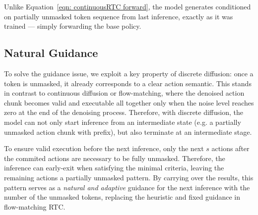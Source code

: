 \documentclass{article}
\begin{document}
Unlike Equation~\ref{eqn: continuousRTC forward}, the model generates conditioned on partially unmasked token sequence from last inference, exactly as it was trained --- simply forwarding the base policy.

\subsection{Natural Guidance}
\label{sec:method_netural}



To solve the guidance issue, we exploit a key property of discrete diffusion: once a token is unmasked, it already corresponds to a clear action semantic.
This stands in contrast to continuous diffusion or flow-matching, where the denoised action chunk becomes valid and executable all together only when the noise level reaches zero at the end of the denoising process. 
Therefore, with discrete diffusion, the model can not only start inference from an intermediate state (e.g. a partially unmasked action chunk with prefix), but also terminate at an intermediate stage. 

To ensure valid execution before the next inference, only the next $s$ actions after the commited actions are necessary to be fully unmasked. Therefore, the inference can early-exit when satisfying the minimal criteria, leaving the remaining actions a partially unmasked pattern. By carrying over the results, this pattern serves as a \emph{natural and adaptive} guidance for the next inference with the number of the unmasked tokens, replacing the heuristic and fixed guidance in flow-matching RTC.




\end{document}
